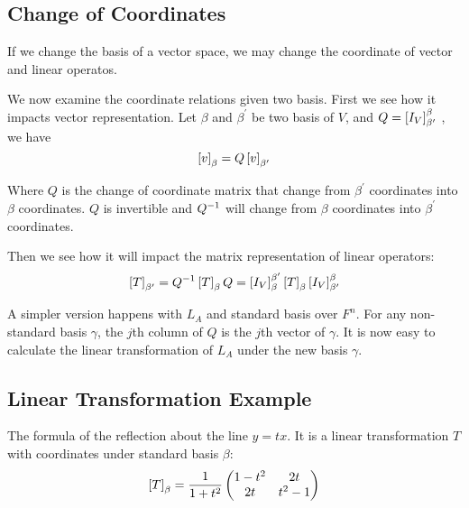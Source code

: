 \subsection{Change of Coordinates}

If we change the basis of a vector space, we may change the coordinate of vector and linear operatos.

We now examine the coordinate relations given two basis. First we see how it impacts vector representation. Let $\beta$ and $\beta^{\prime}$ be two basis of $V$, and $Q=\coordinate{I_V}_{\beta^\prime}^\beta$ , we have 
\begin{equation}
    \coordinate{v}_\beta = Q \coordinate{v}_{\beta^\prime}
\end{equation}

Where $Q$ is the change of coordinate matrix that change from $\beta^\prime$ coordinates into $\beta$ coordinates. $Q$ is invertible and ${Q}^{-1}$ will change from $\beta$ coordinates into $\beta^\prime$ coordinates. 

Then we see how it will impact the matrix representation of linear operators:
\begin{equation}\label{change_of_coordinate_formula}
    \coordinate{T}_{\beta^\prime} = \inverse{Q} \coordinate{T}_{\beta} Q = \coordinate{I_V}_\beta^{\beta^\prime} \coordinate{T}_\beta \coordinate{I_V}_{\beta^\prime}^\beta
\end{equation}

A simpler version happens with $L_A$ and standard basis over $F^n$. For any non-standard basis $\gamma$, the $j$th column of $Q$ is the $j$th vector of $\gamma$. It is now easy to calculate the linear transformation of $L_A$ under the new basis $\gamma$.


\subsection{Linear Transformation Example}

\begin{example}
    The formula of the reflection about the line $y=tx$. It is a linear transformation $T$ with coordinates under standard basis $\beta$:
    \begin{equation*}
        \coordinate{T}_\beta = \frac{1}{1 + t^2} \begin{pmatrix}
            1-t^2 & 2t \\
            2t & t^2 -1
        \end{pmatrix}
    \end{equation*}
\end{example}


